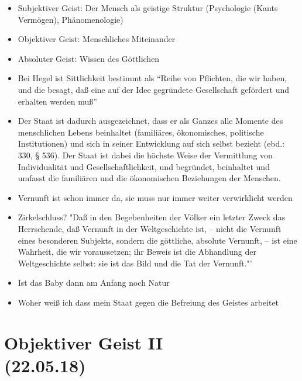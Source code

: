 \documentclass[emulatestandardclasses]{scrartcl}
\begin{document}
\begin{itemize}
  \item Subjektiver Geist: Der Mensch als geistige Struktur (Psychologie (Kants Vermögen), Phänomenologie)
  \item Objektiver Geist: Menschliches Miteinander
  \item Absoluter Geist: Wissen des Göttlichen
  \item Bei Hegel ist Sittlichkeit bestimmt als "`Reihe von Pflichten, die wir haben, und die besagt, daß eine auf der Idee gegründete Gesellschaft gefördert und erhalten werden muß"'
  \item Der Staat ist dadurch ausgezeichnet, dass er als Ganzes alle Momente des menschlichen Lebens beinhaltet (familiäres, ökonomisches, politische Institutionen) und sich in seiner Entwicklung auf sich selbst bezieht (ebd.: 330, § 536). Der Staat ist dabei die höchste Weise der Vermittlung von Individualität und Gesellschaftlichkeit, und begründet, beinhaltet und umfasst die familiären und die ökonomischen Beziehungen der Menschen. 
  \item Vernunft ist schon immer da, sie muss nur immer weiter verwirklicht werden
  \item Zirkelschluss? "Daß in den Begebenheiten der Völker ein letzter Zweck das Herrschende, daß Vernunft in der Weltgeschichte ist, – nicht die Vernunft eines besonderen Subjekts, sondern die göttliche, absolute Vernunft, – ist eine Wahrheit, die wir voraussetzen; ihr Beweis ist die Abhandlung der Weltgeschichte selbst: sie ist das Bild und die Tat der Vernunft."'
  \item Ist das Baby dann am Anfang noch Natur
  \item Woher weiß ich dass mein Staat gegen die Befreiung des Geistes arbeitet
\end{itemize}



\section{Objektiver Geist II\\(22.05.18)}
\end{document}
